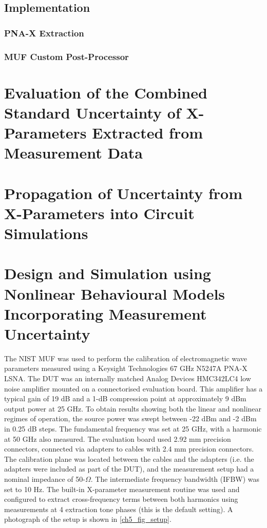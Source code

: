 \documentclass[../thesis/thesis.tex]{subfiles}
\begin{document}
\begin{refsection}
\subsection{Implementation}
\subsubsection{PNA-X Extraction}
\subsubsection{MUF Custom Post-Processor}

\section{Evaluation of the Combined Standard Uncertainty of X-Parameters Extracted from Measurement Data}

\section{Propagation of Uncertainty from X-Parameters into Circuit Simulations}

\section{Design and Simulation using Nonlinear Behavioural Models Incorporating Measurement Uncertainty}

The NIST MUF was used to perform the calibration of electromagnetic wave parameters measured using a Keysight Technologies 67 GHz N5247A PNA-X LSNA. The DUT was an internally matched Analog Devices HMC342LC4 low noise amplifier \cite{hittite_amp} mounted on a connectorised evaluation board. This amplifier has a typical gain of 19 dB and a \mbox{1-dB} compression point at approximately 9 dBm output power at 25 GHz. To obtain results showing both the linear and nonlinear regimes of operation, the source power was swept between -22 dBm and -2 dBm in 0.25 dB steps. The fundamental frequency was set at 25 GHz, with a harmonic at 50 GHz also measured. The evaluation board used 2.92 mm precision connectors, connected via adapters to cables with 2.4 mm precision connectors. The calibration plane was located between the cables and the adapters (i.e. the adapters were included as part of the DUT), and the measurement setup had a nominal impedance of 50-$\Omega$. The intermediate frequency bandwidth (IFBW) was set to 10 Hz. The built-in X-parameter measurement routine was used and configured to extract cross-frequency terms between both harmonics using measurements at 4 extraction tone phases (this is the default setting). A photograph of the setup is shown in \figurename{ \ref{ch5_fig_setup}}.


\end{refsection}
\end{document}
